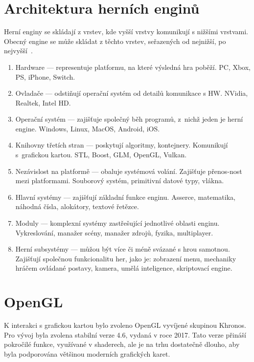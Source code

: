 \documentclass[thesis=M,czech]{FITthesis}[2019/12/23]
\begin{document}
\section{Architektura herních enginů}

Herní enginy se skládají z vrstev, kde vyšší vrstvy komunikují s nižšími vrstvami. Obecný engine se může skládat z těchto vrstev, seřazených od nejnižší, po nejvyšší~\cite{gea_engine_arch}.

\begin{enumerate}

\item Hardware --- representuje platformu, na které výsledná hra poběží. PC, Xbox, PS, iPhone, Switch.

\item Ovladače --- odstiňují operační systém od detailů komunikace s HW. \mbox{NVidia}, Realtek, Intel HD.

\item Operační systém --- zajišťuje společný běh programů, z~nichž jeden je herní engine. Windows, Linux, MacOS, Android, iOS.

\item Knihovny třetích stran --- poskytují algoritmy, kontejnery. Komunikují s~grafickou kartou. STL, Boost, GLM, OpenGL, Vulkan.

\item Nezávislost na platformě --- obaluje systémová volání. Zajišťuje přenos-nost mezi platformami. Souborový systém, primitivní datové typy, vlákna.

\item Hlavní systémy --- zajišťují základní funkce enginu. Asserce, matematika, náhodná čísla, alokátory, textové řetězce.

\item Moduly --- komplexní systémy zastřešující jednotlivé oblasti enginu. Vykreslování, manažer scény, manažer zdrojů, fyzika, multiplayer.

\item Herní subsystémy --- můžou být více či méně svázané s hrou samotnou. Zajišťují společnou funkcionalitu her, jako je: zobrazení menu, mechaniky hráčem ovládané postavy, kamera, umělá inteligence, skriptovací engine.

\end{enumerate}

\section{OpenGL}
K interakci s grafickou kartou bylo zvoleno OpenGL vyvíjené skupinou Khronos. Pro vývoj byla zvolena stabilní verze 4.6, vydaná v roce 2017. Tato verze přináší pokročilé funkce, využívané v shaderech, ale je na trhu dostatečně dlouho, aby byla podporována většinou moderních grafických karet.
\end{document}

